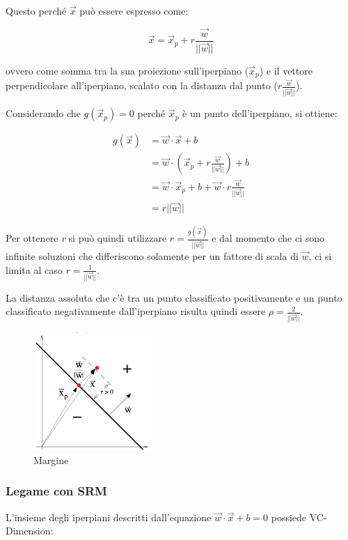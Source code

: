 Questo perché $\vec{x}$ può essere espresso come:

$$ \vec{x} = \vec{x}_p + r\frac{\vec{w}}{||\vec{w}||}$$

ovvero come somma tra la sua proiezione sull'iperpiano ($\vec{x}_p$) e il vettore perpendicolare all'iperpiano, scalato con la distanza dal punto ($r\frac{\vec{w}}{||\vec{w}||}$).

Considerando che $g(\vec{x}_p) = 0$ perché $\vec{x}_p$ è un punto dell'iperpiano, si ottiene:

\begin{align*}
g(\vec{x}) &= \vec{w} \cdot \vec{x} + b  \\
				  &=\vec{w}\cdot (\vec{x}_p + r\frac{\vec{w}}{||\vec{w}||}) + b \\
				  &=\vec{w}\cdot \vec{x}_p + b + \vec{w}\cdot r\frac{\vec{w}}{||\vec{w}||}  \\
				  &= r||\vec{w}||
\end{align*}

Per ottenere \textit{r} si può quindi utilizzare $r = \frac{g(\vec{x})}{||\vec{w}||}$ e dal momento che ci sono infinite soluzioni che differiscono solamente per un fattore di scala di $\vec{w}$, ci si limita al caso $r = \frac{1}{||\vec{w}||}$.

La distanza assoluta che c'è tra un punto classificato positivamente e un punto classificato negativamente dall'iperpiano risulta quindi essere $\rho = \frac{2}{||\vec{w}||}$.

\begin{figure}[htbp]
\centering
\includegraphics[width=0.4\textwidth]{./notes/immagini/l12-margine.png}
\caption{Margine}
\end{figure}

\subsubsection{Legame con SRM}

L'insieme degli iperpiani descritti dall'equazione $\vec{w} \cdot \vec{x} + b = 0$ possiede VC-Dimension:

